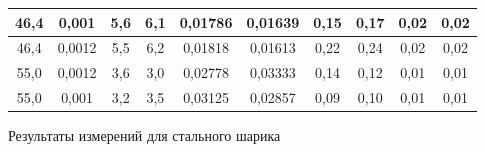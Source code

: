\documentclass[12pt,a4paper]{article}
\begin{document}
\begin{enumerate}
\begin{table}[h!]
\begin{tabular}{|c|c|c|c|c|c|c|c|c|c|}
46,4                       & 0,001                       & 5,6                     & 6,1                     & 0,01786                          & 0,01639                          & 0,15                              & 0,17                              & 0,02                     & 0,02                                             \\ \hline
46,4                       & 0,0012                      & 5,5                     & 6,2                     & 0,01818                          & 0,01613                          & 0,22                              & 0,24                              & 0,02                     & 0,02                                             \\ \hline
55,0                         & 0,0012                      & 3,6                     & 3,0                       & 0,02778                          & 0,03333                          & 0,14                              & 0,12                              & 0,01                     & 0,01                                             \\ \hline
55,0                         & 0,001                       & 3,2                     & 3,5                     & 0,03125                          & 0,02857                          & 0,09                              & 0,10                              & 0,01                     & 0,01                                             \\ \hline
\end{tabular}
\end{table}

\newpage 
	
\begin{table}[h!]
\centering
	\caption{Результаты измерений для стального шарика}


\end{table}
\end{enumerate}
\end{document}

